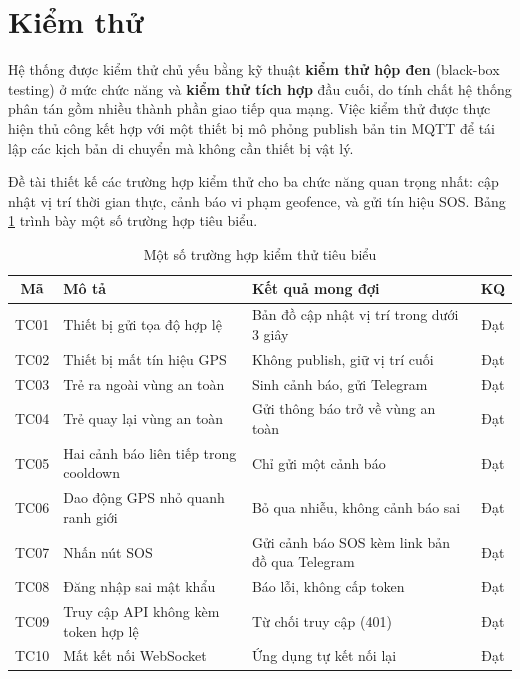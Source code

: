 \documentclass[../DoAn.tex]{subfiles}
\begin{document}
    \section{Kiểm thử}

    Hệ thống được kiểm thử chủ yếu bằng kỹ thuật \textbf{kiểm thử hộp đen} (black-box testing) ở mức chức năng và \textbf{kiểm thử tích hợp} đầu cuối, do tính chất hệ thống phân tán gồm nhiều thành phần giao tiếp qua mạng. Việc kiểm thử được thực hiện thủ công kết hợp với một thiết bị mô phỏng publish bản tin MQTT để tái lập các kịch bản di chuyển mà không cần thiết bị vật lý.

    Đề tài thiết kế các trường hợp kiểm thử cho ba chức năng quan trọng nhất: cập nhật vị trí thời gian thực, cảnh báo vi phạm geofence, và gửi tín hiệu SOS. Bảng \ref{table:kiemthu} trình bày một số trường hợp tiêu biểu.

    \begin{table}[H]
    \centering
    \caption{Một số trường hợp kiểm thử tiêu biểu}
    \label{table:kiemthu}
    \begin{tabular}{|c|p{4.2cm}|p{4.2cm}|c|}
    \hline
    \textbf{Mã} & \textbf{Mô tả} & \textbf{Kết quả mong đợi} & \textbf{KQ} \\ \hline
    TC01 & Thiết bị gửi tọa độ hợp lệ & Bản đồ cập nhật vị trí trong dưới 3 giây & Đạt \\ \hline
    TC02 & Thiết bị mất tín hiệu GPS & Không publish, giữ vị trí cuối & Đạt \\ \hline
    TC03 & Trẻ ra ngoài vùng an toàn & Sinh cảnh báo, gửi Telegram & Đạt \\ \hline
    TC04 & Trẻ quay lại vùng an toàn & Gửi thông báo trở về vùng an toàn & Đạt \\ \hline
    TC05 & Hai cảnh báo liên tiếp trong cooldown & Chỉ gửi một cảnh báo & Đạt \\ \hline
    TC06 & Dao động GPS nhỏ quanh ranh giới & Bỏ qua nhiễu, không cảnh báo sai & Đạt \\ \hline
    TC07 & Nhấn nút SOS & Gửi cảnh báo SOS kèm link bản đồ qua Telegram & Đạt \\ \hline
    TC08 & Đăng nhập sai mật khẩu & Báo lỗi, không cấp token & Đạt \\ \hline
    TC09 & Truy cập API không kèm token hợp lệ & Từ chối truy cập (401) & Đạt \\ \hline
    TC10 & Mất kết nối WebSocket & Ứng dụng tự kết nối lại & Đạt \\ \hline
    \end{tabular}
    \end{table}
\end{document}
